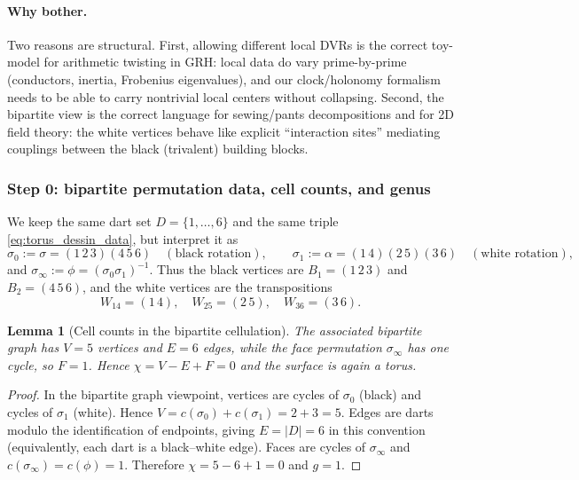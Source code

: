 \documentclass[11pt,oneside]{amsbook}
\numberwithin{equation}{section}
\theoremstyle{plain}
\newtheorem{lemma}[theorem]{Lemma}
\theoremstyle{definition}
\theoremstyle{remark}
\begin{document}
\paragraph{Why bother.}
Two reasons are structural.
First, allowing different local DVRs is the correct toy-model for arithmetic twisting in GRH: local data do vary prime-by-prime (conductors, inertia, Frobenius eigenvalues), and our clock/holonomy formalism needs to be able to carry nontrivial local centers without collapsing.
Second, the bipartite view is the correct language for sewing/pants decompositions and for 2D field theory: the white vertices behave like explicit ``interaction sites'' mediating couplings between the black (trivalent) building blocks.

\subsubsection{Step 0: bipartite permutation data, cell counts, and genus}

We keep the same dart set $D=\{1,\dots,6\}$ and the same triple \eqref{eq:torus_dessin_data}, but interpret it as
\[
\sigma_0 := \sigma=(1\,2\,3)(4\,5\,6)\quad(\text{black rotation}),\qquad
\sigma_1 := \alpha=(1\,4)(2\,5)(3\,6)\quad(\text{white rotation}),
\]
and $\sigma_\infty := \phi=(\sigma_0\sigma_1)^{-1}$.
Thus the black vertices are $B_1=(1\,2\,3)$ and $B_2=(4\,5\,6)$, and the white vertices are the transpositions
\[
W_{14}=(1\,4),\quad W_{25}=(2\,5),\quad W_{36}=(3\,6).
\]

\begin{lemma}[Cell counts in the bipartite cellulation]
The associated bipartite graph has $V=5$ vertices and $E=6$ edges, while the face permutation $\sigma_\infty$ has one cycle, so $F=1$.
Hence $\chi=V-E+F=0$ and the surface is again a torus.
\end{lemma}

\begin{proof}
In the bipartite graph viewpoint, vertices are cycles of $\sigma_0$ (black) and cycles of $\sigma_1$ (white).
Hence $V=c(\sigma_0)+c(\sigma_1)=2+3=5$.
Edges are darts modulo the identification of endpoints, giving $E=|D|=6$ in this convention (equivalently, each dart is a black--white edge).
Faces are cycles of $\sigma_\infty$ and $c(\sigma_\infty)=c(\phi)=1$.
Therefore $\chi=5-6+1=0$ and $g=1$.
\end{proof}
\end{document}
